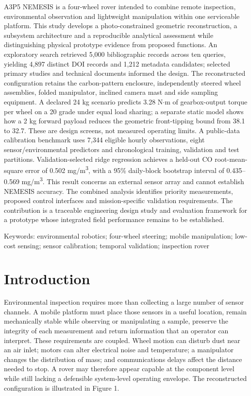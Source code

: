 \documentclass[11pt,a4paper]{article}
\begin{document}
A3P5 NEMESIS is a four-wheel rover intended to combine remote inspection, environmental observation and lightweight manipulation within one serviceable platform. This study develops a photo-constrained geometric reconstruction, a subsystem architecture and a reproducible analytical assessment while distinguishing physical prototype evidence from proposed functions. An exploratory search retrieved 5,000 bibliographic records across ten queries, yielding 4,897 distinct DOI records and 1,212 metadata candidates; selected primary studies and technical documents informed the design. The reconstructed configuration retains the carbon-pattern enclosure, independently steered wheel assemblies, folded manipulator, inclined camera mast and side sampling equipment. A declared 24 kg scenario predicts 3.28 N\ensuremath{\cdot}m of gearbox-output torque per wheel on a 20\textdegree{} grade under equal load sharing; a separate static model shows how a 2 kg forward payload reduces the geometric front-tipping bound from 38.1\textdegree{} to 32.7\textdegree{}. These are design screens, not measured operating limits. A public-data calibration benchmark uses 7,344 eligible hourly observations, eight sensor/environmental predictors and chronological training, validation and test partitions. Validation-selected ridge regression achieves a held-out CO root-mean-square error of 0.502 mg/m\textsuperscript{3}, with a 95\% daily-block bootstrap interval of 0.435--0.569 mg/m\textsuperscript{3}. This result concerns an external sensor array and cannot establish NEMESIS accuracy. The combined analysis identifies priority measurements, proposed control interfaces and mission-specific validation requirements. The contribution is a traceable engineering design study and evaluation framework for a prototype whose integrated field performance remains to be established.

Keywords: environmental robotics; four-wheel steering; mobile manipulation; low-cost sensing; sensor calibration; temporal validation; inspection rover

\FloatBarrier

\section{Introduction}\label{sec:1}

Environmental inspection requires more than collecting a large number of sensor channels. A mobile platform must place those sensors in a useful location, remain mechanically stable while observing or manipulating a sample, preserve the integrity of each measurement and return information that an operator can interpret. These requirements are coupled. Wheel motion can disturb dust near an air inlet; motors can alter electrical noise and temperature; a manipulator changes the distribution of mass; and communications delays affect the distance needed to stop. A rover may therefore appear capable at the component level while still lacking a defensible system-level operating envelope. The reconstructed configuration is illustrated in Figure 1.
\end{document}
